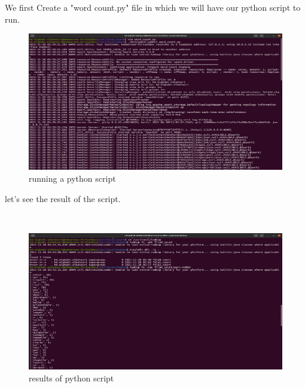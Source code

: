 \begin{spacing}{1.2}
\par We first Create a "word count.py" file in which we will have our python script to run.
\\
\begin{figure}[!htb] 
\begin{center} 
\includegraphics[width=1\linewidth]{Big_Data/Spark/Executing Word_Count using python/running a python script} 
\end{center} 
\caption{running a python script} 
\end{figure} 
\FloatBarrier


\par let's see the result of the script.

\\
\begin{figure}[!htb] 
\begin{center} 
\includegraphics[width=1\linewidth]{Big_Data/Spark/Executing Word_Count using python/results of python script} 
\end{center} 
\caption{results of python script} 
\end{figure} 
\FloatBarrier



\end{spacing}